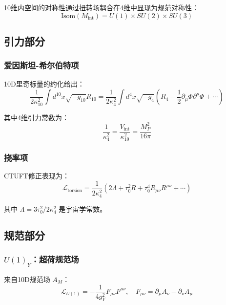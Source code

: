 10维内空间的对称性通过扭转场耦合在4维中显现为规范对称性：
\begin{equation}
    \text{Isom}(M_{\text{int}}) = U(1) \times SU(2) \times SU(3)
\end{equation}

\subsection{引力部分}

\subsubsection{爱因斯坦-希尔伯特项}

10D里奇标量的约化给出：
\begin{equation}
    \frac{1}{2\kappa_{10}^2}\int d^{10}x \sqrt{-g_{10}}R_{10} = \frac{1}{2\kappa_4^2}\int d^4x \sqrt{-g_4}\left(R_4 - \frac{1}{2}\partial_\mu\Phi\partial^\mu\Phi + \cdots\right)
\end{equation}

其中4维引力常数为：
\begin{equation}
    \frac{1}{\kappa_4^2} = \frac{V_{\text{int}}}{\kappa_{10}^2} = \frac{M_P^2}{16\pi}
\end{equation}

\subsubsection{挠率项}

CTUFT修正表现为：
\begin{equation}
    \mathcal{L}_{\text{torsion}} = \frac{1}{2\kappa_4^2}\left(2\Lambda + \tau_0^2 R + \tau_0^4 R_{\mu\nu}R^{\mu\nu} + \cdots\right)
\end{equation}

其中 $\Lambda = 3\tau_0^2/2\kappa_4^2$ 是宇宙学常数。

\subsection{规范部分}

\subsubsection{$U(1)_Y$：超荷规范场}

来自10D规范场 $A_M$：
\begin{equation}
    \mathcal{L}_{U(1)} = -\frac{1}{4g_Y^2}F_{\mu\nu}F^{\mu\nu}, \quad F_{\mu\nu} = \partial_\mu A_\nu - \partial_\nu A_\mu
\end{equation}

